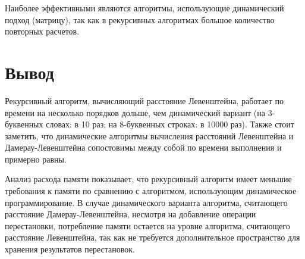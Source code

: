 \clearpage


Наиболее эффективными являются алгоритмы, использующие динамический подход (матрицу), так как в рекурсивных алгоритмах большое количество повторных расчетов.

\section{Вывод}

Рекурсивный алгоритм, вычисляющий расстояние Левенштейна, работает по времени на несколько порядков дольше, чем динамический вариант (на 3-буквенных словах: в 10 раз; на 8-буквенных строках: в 10000 раз). Также стоит заметить, что динамические алгоритмы вычисления расстояний Левенштейна и Дамерау-Левенштейна сопостовимы между собой по времени выполнения и примерно равны.

Анализ расхода памяти показывает, что рекурсивный алгоритм имеет меньшие требования к памяти по сравнению с алгоритмом, использующим динамическое программирование. В случае динамического варианта алгоритма, считающего расстояние Дамерау-Левенштейна, несмотря на добавление операции перестановки, потребление памяти остается на уровне алгоритма, считающего расстояние Левенштейна, так как не требуется дополнительное пространство для хранения результатов перестановок.